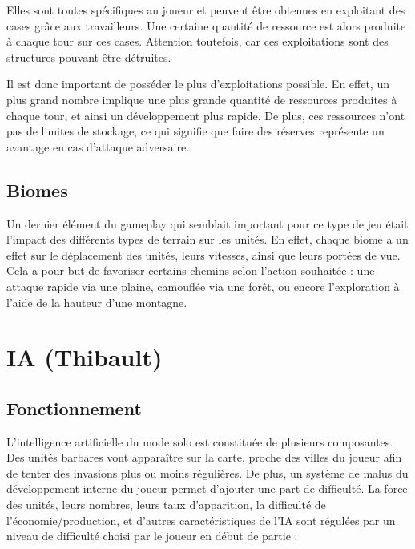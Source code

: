 \documentclass[12pt]{report}
\begin{document}
Elles sont toutes spécifiques au joueur et peuvent être obtenues en exploitant
des cases grâce aux travailleurs. Une certaine quantité de ressource est alors
produite à chaque tour sur ces cases. Attention toutefois, car ces exploitations
sont des structures pouvant être détruites.

Il est donc important de posséder le plus d’exploitations possible. En effet, un
plus grand nombre implique une plus grande quantité de ressources produites à
chaque tour, et ainsi un développement plus rapide. De plus, ces ressources
n’ont pas de limites de stockage, ce qui signifie que faire des réserves
représente un avantage en cas d’attaque adversaire.

\section{Biomes}

Un dernier élément du gameplay qui semblait important pour ce type de jeu était
l’impact des différents types de terrain sur les unités. En effet, chaque biome
a un effet sur le déplacement des unités, leurs vitesses, ainsi que leurs
portées de vue. Cela a pour but de favoriser certains chemins selon l’action
souhaitée : une attaque rapide via une plaine, camouflée via une forêt, ou
encore l'exploration à l’aide de la hauteur d’une montagne.

\chapter{IA (Thibault)}

\section{Fonctionnement}

L’intelligence artificielle du mode solo est constituée de plusieurs
composantes. Des unités barbares vont apparaître sur la carte, proche des villes
du joueur afin de tenter des invasions plus ou moins régulières. De plus, un
système de malus du développement interne du joueur permet d’ajouter une part de
difficulté. La force des unités, leurs nombres, leurs taux d’apparition, la
difficulté de l’économie/production, et d’autres caractéristiques de l’IA sont
régulées par un niveau de difficulté choisi par le joueur en début de partie :
\end{document}
